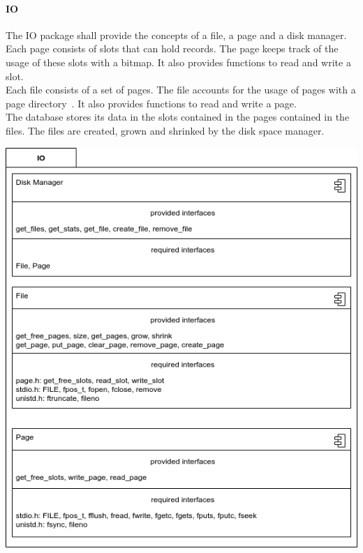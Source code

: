     \paragraph{IO}
        The IO package shall provide the concepts of a file, a page and a disk manager. \\
        Each page consists of slots that can hold records. The page keeps track of the usage of these slots with a bitmap. It also provides functions to read and write a slot. \\
        Each file consists of a set of pages. The file accounts for the usage of pages with a page directory~\autocite{ramakrishnan2000database}. It also provides functions to read and write a page. \\
        The database stores its data in the slots contained in the pages contained in the files. The files are created, grown and shrinked by the disk space manager.  \\
        
        \begin{center}
         \includegraphics[keepaspectratio, width=\textwidth, height=0.6\textheight]{img/io_arch.png} \\
        \end{center}
        \newpage

